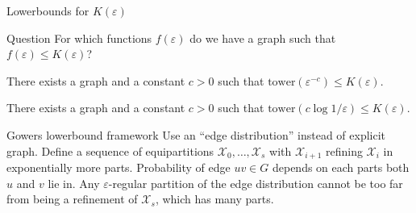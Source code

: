\documentclass{beamer}
\newcommand{\twr}{\mathrm{tower}}
\newcommand{\1}{\mathbbm{1}}
\newcommand{\X}{\mathcal{X}}
\newcommand{\eps}{\varepsilon}
\begin{document}
\begin{frame}{Lowerbounds for $K(\eps)$}
  \begin{block}{Question}
    For which functions $f(\eps)$ do we have a graph such that $f(\eps) \le K(\eps)$?
  \end{block}

  \pause
  \begin{theorem}[Gowers (1997)]
    There exists a graph and a constant $c > 0$ such that $\twr(\eps^{-c}) \le K(\eps)$.
  \end{theorem}

  \pause

  \begin{corollary}[Gowers (1997)]
    There exists a graph and a constant $c > 0$ such that $\twr(c\log 1/\eps) \le
      K(\eps)$.
  \end{corollary}
\end{frame}




\begin{frame}{Gowers lowerbound framework}
  Use an ``edge distribution'' instead of explicit graph.
  \pause
  Define a sequence of equipartitions $\X_0, \dots, \X_s$ with $\X_{i + 1}$ refining
  $\X_i$ in exponentially more parts.
  \pause
  Probability of edge $uv \in G$ depends on each parts both $u$ and $v$ lie in.
  \pause
  Any $\eps$-regular partition of the edge distribution cannot be too far from being a
  refinement of $\X_s$, which has many parts.
\end{frame}
\end{document}
